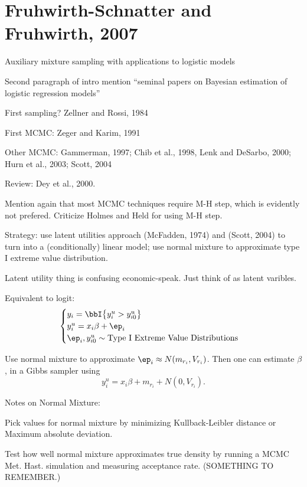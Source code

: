 \documentclass{article}
\begin{document}
\section{Fruhwirth-Schnatter and Fruhwirth, 2007}

Auxiliary mixture sampling with applications to logistic models

\begin{outline}

\1 Second paragraph of intro mention ``seminal papers on Bayesian estimation of
logistic regression models''

  \2 First sampling? Zellner and Rossi, 1984

  \2 First MCMC: Zeger and Karim, 1991

  \2 Other MCMC: Gammerman, 1997; Chib et al., 1998, Lenk and DeSarbo, 2000;
  Hurn et al., 2003; Scott, 2004

  \2 Review: Dey et al., 2000.

\1 Mention again that most MCMC techniques require M-H step, which is evidently
not prefered.  Criticize Holmes and Held for using M-H step.

\1 Strategy: use latent utilities approach (McFadden, 1974) and (Scott, 2004) to
turn into a (conditionally) linear model; use normal mixture to approximate type
I extreme value distribution.

  \2 Latent utility thing is confusing economic-speak.  Just think of as latent
  varibles.

  \2 Equivalent to logit: 
  \begin{displaymath}
  \begin{cases}
    y_i = \bbI \big\{y_i^u > y_{i0}^u \big\} & \\
    y_i^u = x_i \beta + \ep_i & \\
    \ep_i, y_{i0}^u \sim \textmd{Type I Extreme Value Distributions} &
  \end{cases}
  \end{displaymath}

  Use normal mixture to approximate $\ep_i \approx N(m_{r_i},
  V_{r_i})$.  Then one can estimate $\beta$, in a Gibbs sampler using
  \[
  y_i^u = x_i \beta + m_{r_i} + N(0, V_{r_i}).
  \]

\1 Notes on Normal Mixture:

  \2 Pick values for normal mixture by minimizing Kullback-Leibler distance or
  Maximum absolute deviation.

  \2 Test how well normal mixture approximates true density by running a MCMC
  Met. Hast. simulation and measuring acceptance rate.  (SOMETHING TO REMEMBER.)


\end{outline}
\end{document}
